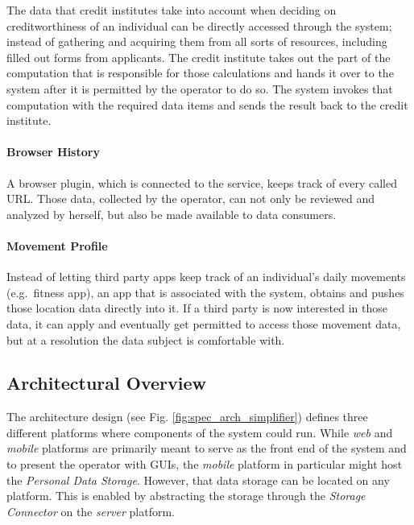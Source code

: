 \documentclass[12pt,english,a4paper,titlepage,cleardoublepage=empty,dottedtoc]{report}
\begin{document}
The data that credit institutes take into account when deciding on
creditworthiness of an individual can be directly accessed through the
system; instead of gathering and acquiring them from all sorts of
resources, including filled out forms from applicants. The credit
institute takes out the part of the computation that is responsible for
those calculations and hands it over to the system after it is permitted
by the operator to do so. The system invokes that computation with the
required data items and sends the result back to the credit institute.

\paragraph{Browser History}\label{browser-history}

A browser plugin, which is connected to the service, keeps track of
every called URL. Those data, collected by the operator, can not only be
reviewed and analyzed by herself, but also be made available to data
consumers.

\paragraph{Movement Profile}\label{movement-profile}

Instead of letting third party apps keep track of an individual's daily
movements (e.g.~fitness app), an app that is associated with the system,
obtains and pushes those location data directly into it. If a third
party is now interested in those data, it can apply and eventually get
permitted to access those movement data, but at a resolution the data
subject is comfortable with.

\subsection{Architectural Overview}\label{architectural-overview}

The architecture design (see Fig. \ref{fig:spec_arch_simplifier})
defines three different platforms where components of the system could
run. While \emph{web} and \emph{mobile} platforms are primarily meant to
serve as the front end of the system and to present the operator with
GUIs, the \emph{mobile} platform in particular might host the
\emph{Personal Data Storage}. However, that data storage can be located
on any platform. This is enabled by abstracting the storage through the
\emph{Storage Connector} on the \emph{server} platform.
\end{document}
